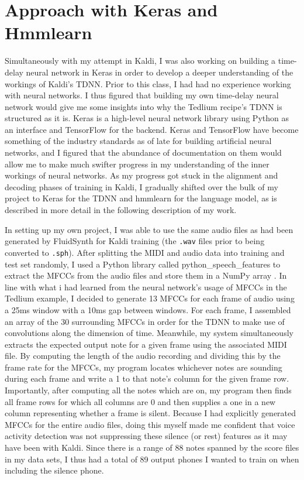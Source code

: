 \documentclass[conference]{IEEEtran}
\begin{document}
\section{Approach with Keras and Hmmlearn}

Simultaneously with my attempt in Kaldi, I was also working on building a time-delay neural network in Keras in order to develop a deeper understanding of the workings of Kaldi's TDNN. Prior to this class, I had had no experience working with neural networks. I thus figured that building my own time-delay neural network would give me some insights into why the Tedlium recipe's TDNN is structured as it is. Keras is a high-level neural network library using Python as an interface and TensorFlow for the backend. Keras and TensorFlow have become something of the industry standards as of late for building artificial neural networks, and I figured that the abundance of documentation on them would allow me to make much swifter progress in my understanding of the inner workings of neural networks. As my progress got stuck in the alignment and decoding phases of training in Kaldi, I gradually shifted over the bulk of my project to Keras for the TDNN and hmmlearn for the language model, as is described in more detail in the following description of my work.

In setting up my own project, I was able to use the same audio files as had been generated by FluidSynth for Kaldi training (the \texttt{.wav} files prior to being converted to \texttt{.sph}). After splitting the MIDI and audio data into training and test set randomly, I used a Python library called python\_speech\_features to extract the MFCCs from the audio files and store them in a NumPy array \cite{lyons}. In line with what i had learned from the neural network's usage of MFCCs in the Tedlium example, I decided to generate 13 MFCCs for each frame of audio using a 25ms window with a 10ms gap between windows. For each frame, I assembled an array of the 30 surrounding MFCCs in order for the TDNN to make use of convolutions along the dimension of time. Meanwhile, my system simultaneously extracts the expected output note for a given frame using the associated MIDI file. By computing the length of the audio recording and dividing this by the frame rate for the MFCCs, my program locates whichever notes are sounding during each frame and write a 1 to that note's column for the given frame row. Importantly, after computing all the notes which are on, my program then finds all frame rows for which all columns are 0 and then supplies a one in a new column representing whether a frame is silent. Because I had explicitly generated MFCCs for the entire audio files, doing this myself made me confident that voice activity detection was not suppressing these silence (or rest) features as it may have been with Kaldi. Since there is a range of 88 notes spanned by the score files in my data sets, I thus had a total of 89 output phones I wanted to train on when including the silence phone.
\end{document}
